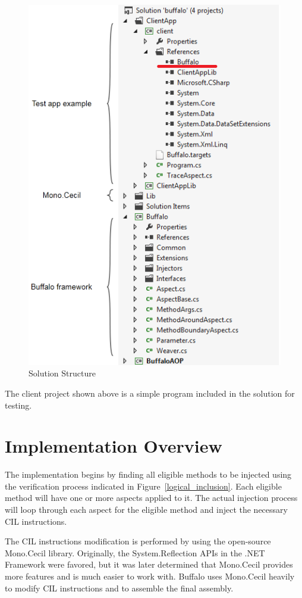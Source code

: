 \begin{figure}[H]
  \includegraphics[scale=1.0]{SolutionExplorer3.PNG}
  \centering
  \caption{Solution Structure\label{solutionexplorer}}
\end{figure}

The client project shown above is a simple program included in the solution for testing.

\section{Implementation Overview}

The implementation begins by finding all eligible methods to be injected using the verification process indicated in Figure~\ref{logical_inclusion}. Each eligible method will have one or more aspects applied to it. The actual injection process will loop through each aspect for the eligible method and inject the necessary CIL instructions.

The CIL instructions modification is performed by using the open-source Mono.Cecil library. Originally, the System.Reflection APIs in the .NET Framework were favored, but it was later determined that Mono.Cecil provides more features and is much easier to work with. Buffalo uses Mono.Cecil heavily to modify CIL instructions and to assemble the final assembly.

